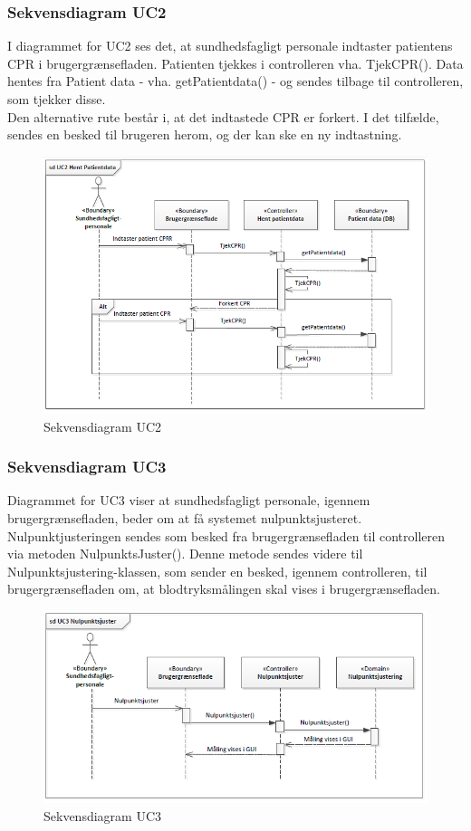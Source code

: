 \subsubsection{Sekvensdiagram UC2}
I diagrammet for UC2 ses det, at sundhedsfagligt personale indtaster patientens CPR i brugergrænsefladen. Patienten tjekkes i controlleren vha. TjekCPR(). Data hentes fra Patient data - vha. getPatientdata() - og sendes tilbage til controlleren, som tjekker disse. \\
Den alternative rute består i, at det indtastede CPR er forkert. I det tilfælde, sendes en besked til brugeren herom, og der kan ske en ny indtastning.
\begin{figure}[H]
\centering
\includegraphics[scale=0.70]{sd2}
\caption{Sekvensdiagram UC2}
\end{figure}

\subsubsection{Sekvensdiagram UC3}
Diagrammet for UC3 viser at sundhedsfagligt personale, igennem brugergrænsefladen, beder om at få systemet nulpunktsjusteret. Nulpunktjusteringen sendes som besked fra brugergrænsefladen til controlleren via metoden NulpunktsJuster(). Denne metode sendes videre til Nulpunktsjustering-klassen, som sender en besked, igennem controlleren, til brugergrænsefladen om, at blodtryksmålingen skal vises i brugergrænsefladen.
\begin{figure}[H]
\centering
\includegraphics[scale=0.70]{sd3.PNG}
\caption{Sekvensdiagram UC3}
\end{figure}

